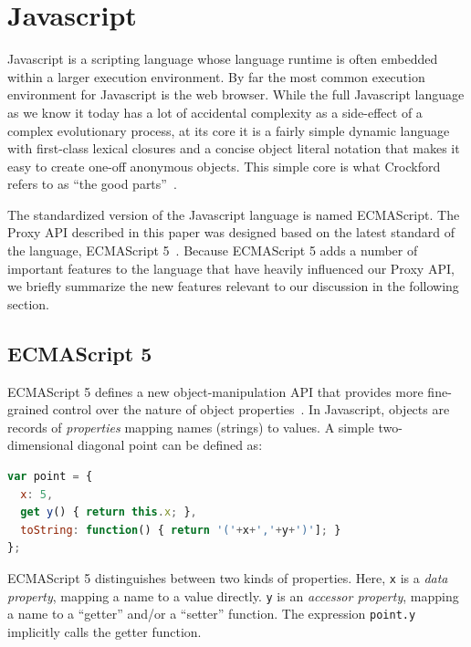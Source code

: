 \documentclass{sig-alternate}
\begin{document}
\section{Javascript}

Javascript is a scripting language whose language runtime is often embedded within a larger execution environment. By far the most common execution environment for Javascript is the web browser. While the full Javascript language as we know it today has a lot of accidental complexity as a side-effect of a complex evolutionary process, at its core it is a fairly simple dynamic language with first-class lexical closures and a concise object literal notation that makes it easy to create one-off anonymous objects. This simple core is what Crockford refers to as ``the good parts''~\cite{crockford08good}.

The standardized version of the Javascript language is named ECMAScript. The Proxy API described in this paper was designed based on the latest standard of the language, ECMAScript 5~\cite{ECMA262}. Because ECMAScript 5 adds a number of important features to the language that have heavily influenced our Proxy API, we briefly summarize the new features relevant to our discussion in the following section.

\subsection{ECMAScript 5}
\label{sub:es5}

ECMAScript 5 defines a new object-manipulation API that provides more fine-grained control over the nature of object properties~\cite{ECMA262}. In Javascript, objects are records of \emph{properties} mapping names (strings) to values. A simple two-dimensional diagonal point can be defined as:

\begin{lstlisting}[language=javascript]
var point = {
  x: 5,
  get y() { return this.x; },
  toString: function() { return '('+x+','+y+')']; }
};
\end{lstlisting}

ECMAScript 5 distinguishes between two kinds of properties. Here, \texttt{x} is a \emph{data property}, mapping a name to a value directly. \texttt{y} is an \emph{accessor property}, mapping a name to a ``getter'' and/or a ``setter'' function. The expression \texttt{point.y} implicitly calls the getter function.
\end{document}

